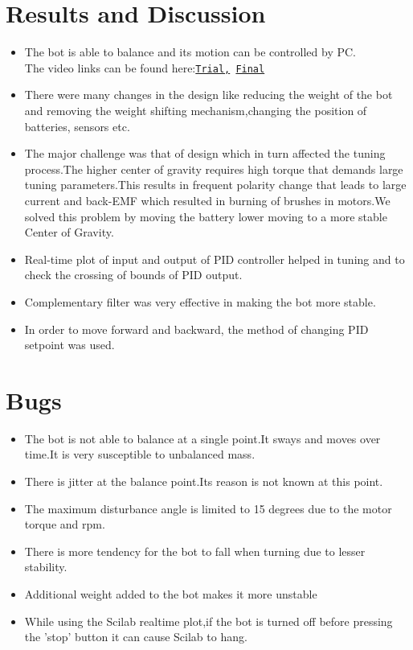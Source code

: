 \documentclass[report]{res}
\begin{document}
	
	\section{\large Results and Discussion}
	\begin{itemize}
		\item The bot is able to balance and its motion can be controlled by PC.\\
				The video links can be found here:\quad \texttt{\href{https://www.youtube.com/watch?v=RQ8faIJj1zk&feature=youtu.be}{Trial,} \quad \href{https://www.youtube.com/watch?v=MUy5qxsNUb8}{Final}}
		\item There were many changes in the design like reducing the weight of the bot and removing the weight shifting mechanism,changing the position of batteries, sensors etc.
		\item The major challenge was that of design which in turn affected the tuning process.The higher center of gravity requires high torque that demands large tuning parameters.This results in frequent polarity change that leads to large current and back-EMF which resulted in burning of brushes in motors.We solved this problem by moving the battery lower moving to a more stable Center of Gravity. 
		\item Real-time plot of input and output of PID controller helped in tuning and to check the crossing of bounds of PID output.
		\item Complementary filter was very effective in making the bot more stable.
		\item In order to move forward and backward, the method of changing PID setpoint was used.
	\end{itemize}
	
	
	\section{\large Bugs}
	\begin{itemize}
		\item The bot is not able to balance at a single point.It sways and moves over time.It is very susceptible to unbalanced mass.
		\item There is jitter at the balance point.Its reason is not known at this point.
		\item The maximum disturbance angle is limited to 15 degrees due to the motor torque and rpm.
		\item There is more tendency for the bot to fall when turning due to lesser stability. 
		\item Additional weight added to the bot makes it more unstable
		\item While using the Scilab realtime plot,if the bot is turned off before pressing the 'stop' button it can cause Scilab to hang.
	\end{itemize}
	
\end{document}
